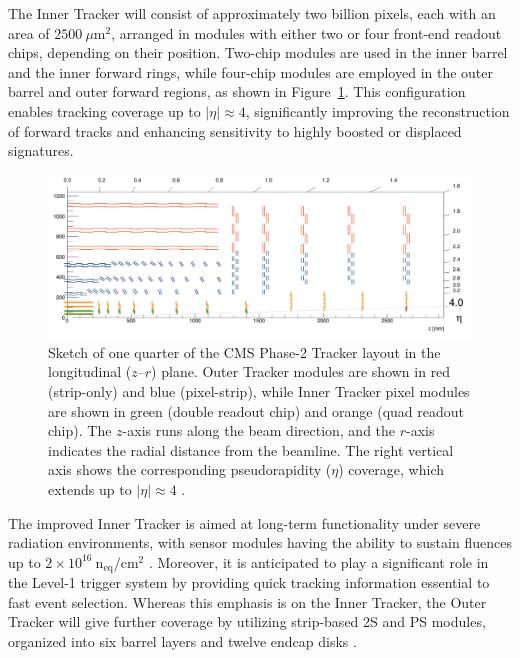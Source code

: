 The Inner Tracker will consist of approximately two billion pixels, each with an area of $2500~\mu\text{m}^2$, arranged in modules with either two or four front-end readout chips, depending on their position. Two-chip modules are used in the inner barrel and the inner forward rings, while four-chip modules are employed in the outer barrel and outer forward regions, as shown in Figure~\ref{fig:tracking_layout}. This configuration enables tracking coverage up to $|\eta| \approx 4$, significantly improving the reconstruction of forward tracks and enhancing sensitivity to highly boosted or displaced signatures.

\begin{figure}[H]
    \centering
    \includegraphics[width=1\textwidth]{images/tracker_layout.png}
    \caption{Sketch of one quarter of the CMS Phase-2 Tracker layout in the longitudinal ($z$--$r$) plane. Outer Tracker modules are shown in red (strip-only) and blue (pixel-strip), while Inner Tracker pixel modules are shown in green (double readout chip) and orange (quad readout chip). The $z$-axis runs along the beam direction, and the $r$-axis indicates the radial distance from the beamline. The right vertical axis shows the corresponding pseudorapidity ($\eta$) coverage, which extends up to $|\eta| \approx 4$ \cite{Outertracker}.}
    \label{fig:tracking_layout}
\end{figure}

The improved Inner Tracker is aimed at long-term functionality under severe radiation environments, with sensor modules having the ability to sustain fluences up to $2 \times 10^{16}~\text{n}_\text{eq}/\text{cm}^2$ \cite{Malik:2816244}. Moreover, it is anticipated to play a significant role in the Level-1 trigger system by providing quick tracking information essential to fast event selection. Whereas this emphasis is on the Inner Tracker, the Outer Tracker will give further coverage by utilizing strip-based 2S and PS modules, organized into six barrel layers and twelve endcap disks \cite{Outertracker}.

